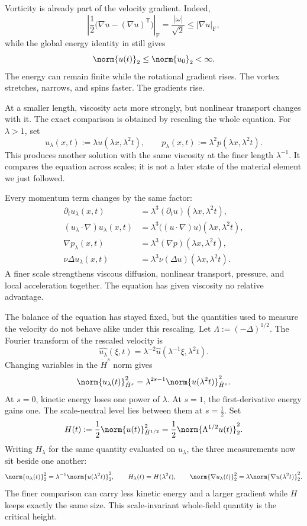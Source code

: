 Vorticity is already part of the velocity gradient.
Indeed,
\[
  \left|
    \frac12\bigl(\nabla u-(\nabla u)^{\mathsf T}\bigr)
  \right|_{\mathrm F}
  =
  \frac{|\omega|}{\sqrt2}
  \leq
  |\nabla u|_{\mathrm F},
\]
while the global energy identity in  still gives
\[
  \norm{u(t)}_2
  \leq
  \norm{u_0}_2
  <\infty.
\]
The energy can remain finite while the rotational gradient rises.
The vortex stretches, narrows, and spins faster.
The gradients rise.


At a smaller length, viscosity acts more strongly, but nonlinear transport changes with it.
The exact comparison is obtained by rescaling the whole equation.
For \(\lambda>1\), set
\[
  u_\lambda(x,t)
  :=
  \lambda u(\lambda x,\lambda^2t),
  \qquad
  p_\lambda(x,t)
  :=
  \lambda^2p(\lambda x,\lambda^2t).
\]
This produces another solution with the same viscosity at the finer length \(\lambda^{-1}\).
It compares the equation across scales; it is not a later state of the material element we just followed.

Every momentum term changes by the same factor:
\[
\begin{aligned}
  \partial_tu_\lambda(x,t)
  &=
  \lambda^3(\partial_tu)(\lambda x,\lambda^2t),
  \\
  (u_\lambda\cdot\nabla)u_\lambda(x,t)
  &=
  \lambda^3\bigl((u\cdot\nabla)u\bigr)(\lambda x,\lambda^2t),
  \\
  \nabla p_\lambda(x,t)
  &=
  \lambda^3(\nabla p)(\lambda x,\lambda^2t),
  \\
  \nu\Delta u_\lambda(x,t)
  &=
  \lambda^3\nu(\Delta u)(\lambda x,\lambda^2t).
\end{aligned}
\]
A finer scale strengthens viscous diffusion, nonlinear transport, pressure, and local acceleration together.
The equation has given viscosity no relative advantage.


The balance of the equation has stayed fixed, but the quantities used to measure the velocity do not behave alike under this rescaling.
Let \(\Lambda:=(-\Delta)^{1/2}\).
The Fourier transform of the rescaled velocity is
\[
  \widehat{u_\lambda}(\xi,t)
  =
  \lambda^{-2}\widehat u(\lambda^{-1}\xi,\lambda^2t).
\]
Changing variables in the \(\dot H^s\) norm gives
\[
  \norm{u_\lambda(t)}_{\dot H^s}^2
  =
  \lambda^{2s-1}
  \norm{u(\lambda^2t)}_{\dot H^s}^2.
\]
At \(s=0\), kinetic energy loses one power of \(\lambda\).
At \(s=1\), the first-derivative energy gains one.
The scale-neutral level lies between them at \(s=\tfrac12\).
Set
\[
  H(t)
  :=
  \frac12\norm{u(t)}_{\dot H^{1/2}}^2
  =
  \frac12\norm{\Lambda^{1/2}u(t)}_2^2.
\]
Writing \(H_\lambda\) for the same quantity evaluated on \(u_\lambda\), the three measurements now sit beside one another:
\[
  \norm{u_\lambda(t)}_2^2
  =
  \lambda^{-1}\norm{u(\lambda^2t)}_2^2,
  \qquad
  H_\lambda(t)=H(\lambda^2t),
  \qquad
  \norm{\nabla u_\lambda(t)}_2^2
  =
  \lambda\norm{\nabla u(\lambda^2t)}_2^2.
\]
The finer comparison can carry less kinetic energy and a larger gradient while \(H\) keeps exactly the same size.
This scale-invariant whole-field quantity is the critical height.

